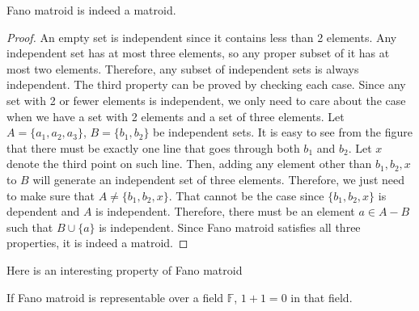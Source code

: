 \begin{thm}
Fano matroid is indeed a matroid.
\end{thm}

\begin{proof}
An empty set is independent since it contains less than 2 elements.
Any independent set has at most three elements, so any proper subset of it has at most two elements.
Therefore, any subset of independent sets is always independent.
The third property can be proved by checking each case.
Since any set with 2 or fewer elements is independent, we only need to care about the case when we have a set with 2 elements and a set of three elements.
Let $A = \{ a_1, a_2, a_3 \}$, $B = \{ b_1, b_2\}$ be independent sets.
It is easy to see from the figure that there must be exactly one line that goes through both $b_1$ and $b_2$.
Let $x$ denote the third point on such line.
Then, adding any element other than $b_1, b_2, x$ to $B$ will generate an independent set of three elements.
Therefore, we just need to make sure that $A \neq \{ b_1, b_2, x \}$.
That cannot be the case since $\{ b_1, b_2, x \}$ is dependent and $A$ is independent.
Therefore, there must be an element $a \in A - B$ such that $B \cup \{ a \}$ is independent.
Since Fano matroid satisfies all three properties, it is indeed a matroid.
\end{proof}


Here is an interesting property of Fano matroid
\begin{thm}
If Fano matroid is representable over a field $\mathbb{F}$, $1 + 1 = 0$ in that field.
\end{thm}

